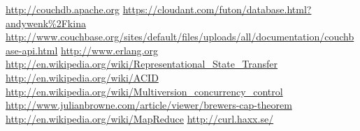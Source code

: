 \documentclass[19pt,landscape,twocolumn]{article}
\begin{document}
\begin{thebibliography}{sotief}
\url{http://couchdb.apache.org}
\url{https://cloudant.com/futon/database.html?andywenk%2Fkina}
\url{http://www.couchbase.org/sites/default/files/uploads/all/documentation/couchbase-api.html}
\url{http://www.erlang.org}
\url{http://en.wikipedia.org/wiki/Representational_State_Transfer}
\url{http://en.wikipedia.org/wiki/ACID}
\url{http://en.wikipedia.org/wiki/Multiversion_concurrency_control}
\url{http://www.julianbrowne.com/article/viewer/brewers-cap-theorem}
\url{http://en.wikipedia.org/wiki/MapReduce}
\url{http://curl.haxx.se/}
\end{thebibliography}
\end{document}
